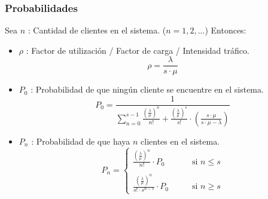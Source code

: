 \documentclass{templateNote}
\begin{document}
\subsubsection{Probabilidades}
Sea $n$ : Cantidad de clientes en el sistema. ($n=1,2,...$)
Entonces:
\begin{itemize}
    \item $\rho$ : Factor de utilizaci\'on / Factor de carga / Intensidad tr\'afico.
    \begin{equation*}
        \rho = \frac{\lambda}{s \cdot \mu}
    \end{equation*}

    \item $P_0$ : Probabilidad de que ning\'un cliente se encuentre en el sistema.
    \begin{equation*}
        P_0 = \frac{1}{\displaystyle\sum_{n=0}^{s-1}{\frac{\left(\frac{\lambda}{\mu}\right)^n}{n!} + \frac{\left(\frac{\lambda}{\mu}\right)^s}{s!} \cdot \left(\frac{s \cdot \mu}{s \cdot \mu - \lambda}\right)}}
    \end{equation*}
    
    \item $P_n$ : Probabilidad de que haya $n$ clientes en el sistema.
    \begin{equation*}
        P_n = \begin{cases}
            \displaystyle\frac{\left(\frac{\lambda}{\mu}\right)^n}{n!} \cdot P_0 & \qquad \text{si } n \leq s \\
            \\
            \displaystyle\frac{\left(\frac{\lambda}{\mu}\right)^n}{s! \cdot s^{n-s}} \cdot P_0 & \qquad \text{si } n \geq s
        \end{cases}
    \end{equation*}
\end{itemize}

\newpage
\end{document}
